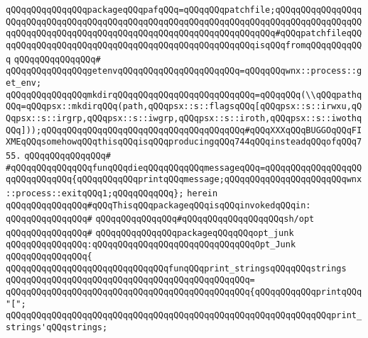 \verb|qQQqqQQqqQQqqQQqpackageqQQqpafqQQq=qQQqqQQqpatchfile;qQQqqQQqqQQqqQQqqQQqqQQqqQQqqQQqqQQqqQQqqQQqqQQqqQQqqQQqqQQqqQQqqQQqqQQqqQQqqQQqqQQqqQQqqQQqqQQqqQQqqQQqqQQqqQQqqQQqqQQqqQQqqQQqqQQqqQQqqQQq#qQQqpatchfileqQQqqQQqqQQqqQQqqQQqqQQqqQQqqQQqqQQqqQQqqQQqqQQqqQQqisqQQqfromqQQqqQQqqQQq|\newline
\verb|qQQqqQQqqQQqqQQq#|\newline
\verb|qQQqqQQqqQQqqQQqgetenvqQQqqQQqqQQqqQQqqQQqqQQq=qQQqqQQqwnx::process::get_env;|\newline
\verb|qQQqqQQqqQQqqQQqmkdirqQQqqQQqqQQqqQQqqQQqqQQqqQQq=qQQqqQQq(\\qQQqpathqQQq=qQQqpsx::mkdirqQQq(path,qQQqpsx::s::flagsqQQq[qQQqpsx::s::irwxu,qQQqpsx::s::irgrp,qQQqpsx::s::iwgrp,qQQqpsx::s::iroth,qQQqpsx::s::iwothqQQq]));qQQqqQQqqQQqqQQqqQQqqQQqqQQqqQQqqQQqqQQq#qQQqXXXqQQqBUGGOqQQqFIXMEqQQqsomehowqQQqthisqQQqisqQQqproducingqQQq744qQQqinsteadqQQqofqQQq755.|\newline
\verb|qQQqqQQqqQQqqQQq#|\newline
\verb|#qQQqqQQqqQQqqQQqfunqQQqdieqQQqqQQqqQQqmessageqQQq=qQQqqQQqqQQqqQQqqQQqqQQqqQQqqQQq{qQQqqQQqqQQqprintqQQqmessage;qQQqqQQqqQQqqQQqqQQqqQQqwnx::process::exitqQQq1;qQQqqQQqqQQq};|\newline
\verb|herein|\newline
\newline
\verb|qQQqqQQqqQQqqQQq#qQQqThisqQQqpackageqQQqisqQQqinvokedqQQqin:|\newline
\verb|qQQqqQQqqQQqqQQq#|\newline
\verb|qQQqqQQqqQQqqQQq#qQQqqQQqqQQqqQQqqQQqsh/opt|\newline
\verb|qQQqqQQqqQQqqQQq#|\newline
\verb|qQQqqQQqqQQqqQQqpackageqQQqqQQqopt_junk|\newline
\verb|qQQqqQQqqQQqqQQq:qQQqqQQqqQQqqQQqqQQqqQQqqQQqqQQqOpt_Junk|\newline
\verb|qQQqqQQqqQQqqQQq{|\newline
\newline
\verb|qQQqqQQqqQQqqQQqqQQqqQQqqQQqqQQqfunqQQqprint_stringsqQQqqQQqstrings|\newline
\verb|qQQqqQQqqQQqqQQqqQQqqQQqqQQqqQQqqQQqqQQqqQQqqQQq=|\newline
\verb|qQQqqQQqqQQqqQQqqQQqqQQqqQQqqQQqqQQqqQQqqQQqqQQq{qQQqqQQqqQQqprintqQQq"[";|\newline
\verb|qQQqqQQqqQQqqQQqqQQqqQQqqQQqqQQqqQQqqQQqqQQqqQQqqQQqqQQqqQQqqQQqprint_strings'qQQqstrings;|\newline
